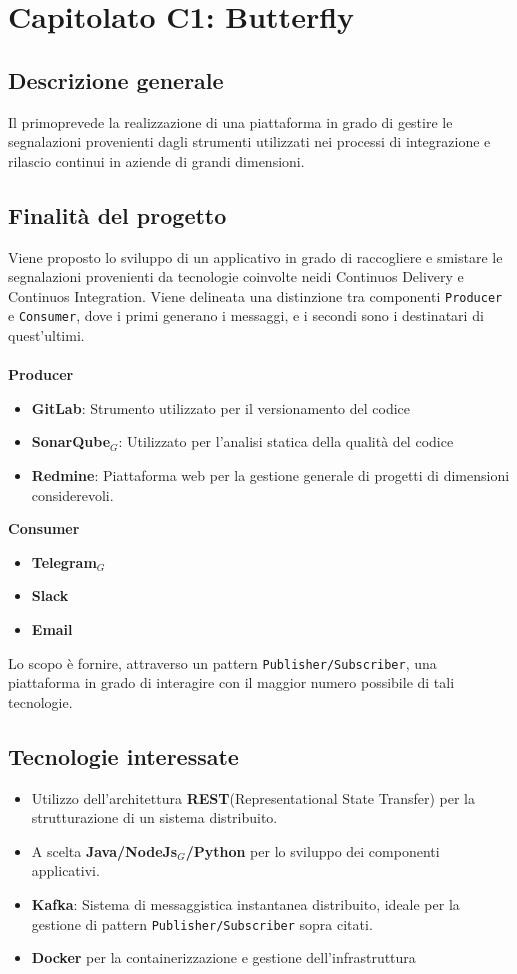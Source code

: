 \chapter{Capitolato C1: Butterfly}
\section{Descrizione generale}
Il primoprevede la realizzazione di una piattaforma in grado di gestire le segnalazioni provenienti dagli strumenti utilizzati nei processi di integrazione e rilascio continui in aziende di grandi dimensioni. 

\section{Finalit\`a del progetto}
Viene proposto lo sviluppo di un applicativo in grado di raccogliere e smistare le segnalazioni provenienti da tecnologie coinvolte neidi Continuos Delivery e Continuos Integration.
Viene delineata una distinzione tra componenti \texttt{Producer} e \texttt{Consumer}, dove i primi generano i messaggi, e i secondi sono i destinatari di quest'ultimi.\\
\\
\textbf{Producer}
	\begin{itemize}
	\item \textbf{GitLab}: Strumento utilizzato per il versionamento del codice
	\item \textbf{SonarQube$_{G}$}: Utilizzato per l'analisi statica della qualità del codice
	\item \textbf{Redmine}: Piattaforma web per la gestione generale di progetti di dimensioni considerevoli.
	\end{itemize}
\textbf{Consumer}
	\begin{itemize}	
		\item \textbf{Telegram$_{G}$}
		\item \textbf{Slack}
		\item \textbf{Email}
	\end{itemize}

Lo scopo è fornire, attraverso un pattern \texttt{Publisher/Subscriber}, una piattaforma in grado di interagire con il maggior numero possibile di tali tecnologie. 	
	
	
\section{Tecnologie interessate}
	\begin{itemize}
		\item Utilizzo dell'architettura \textbf{REST}(Representational State Transfer) per la strutturazione di un sistema distribuito.
		\item A scelta \textbf{Java/NodeJs$_{G}$/Python} per lo sviluppo dei componenti applicativi.
		\item \textbf{Kafka}: Sistema di messaggistica instantanea distribuito, ideale per la gestione di pattern \texttt{Publisher/Subscriber} sopra citati. 
		\item \textbf{Docker} per la containerizzazione e gestione dell'infrastruttura
	\end{itemize}


